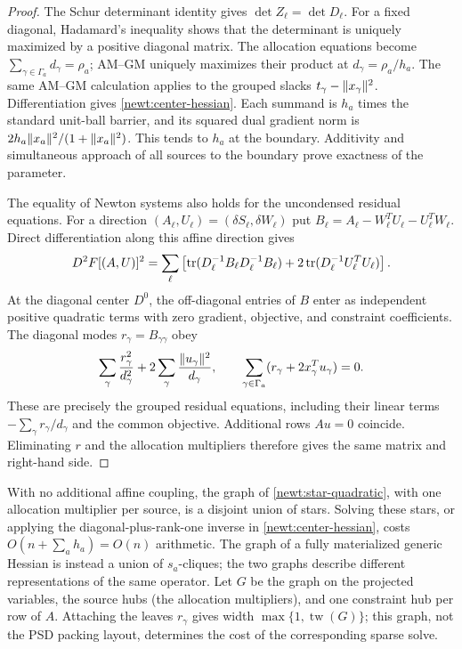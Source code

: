 \begin{proof}
The Schur determinant identity gives $\det Z_\ell=\det D_\ell$.
For a fixed diagonal, Hadamard's inequality shows that the determinant
is uniquely maximized by a positive diagonal matrix.  The allocation equations become
$\sum_{\gamma\in\Gamma_a}d_\gamma=\rho_a$; AM--GM uniquely maximizes
their product at $d_\gamma=\rho_a/h_a$.  The same AM--GM calculation
applies to the grouped slacks $t_\gamma-\lVert x_\gamma\rVert^2$.
Differentiation gives \eqref{newt:center-hessian}.  Each summand is $h_a$
times the standard unit-ball barrier, and its squared dual gradient norm is
$2h_a\lVert x_a\rVert^2/(1+\lVert x_a\rVert^2)$.  This tends to $h_a$ at the
boundary.  Additivity and simultaneous approach of all sources to the
boundary prove exactness of the parameter.

The equality of Newton systems also holds for the uncondensed residual
equations.  For a direction $(A_\ell,U_\ell)=(\delta S_\ell,\delta W_\ell)$
put $B_\ell=A_\ell-W_\ell^TU_\ell-U_\ell^TW_\ell$.  Direct
differentiation along this affine direction gives
\begin{equation}\label{newt:lifted-hessian}
 D^2F[(A,U)]^2=\sum_\ell\left[
 \operatorname{tr}(D_\ell^{-1}B_\ell D_\ell^{-1}B_\ell)
       +2\operatorname{tr}(D_\ell^{-1}U_\ell^TU_\ell)\right].
\end{equation}
At the diagonal center $D^0$, the off-diagonal entries of $B$ enter as
independent positive quadratic terms with zero gradient, objective, and
constraint coefficients.  The diagonal modes $r_\gamma=B_{\gamma\gamma}$ obey
\begin{equation}\label{newt:star-quadratic}
 \sum_\gamma\frac{r_\gamma^2}{d_\gamma^2}
       +2\sum_\gamma\frac{\lVert u_\gamma\rVert^2}{d_\gamma},
 \qquad
 \sum_{\gamma\in\Gamma_a}
       (r_\gamma+2x_\gamma^Tu_\gamma)=0.
\end{equation}
These are precisely the grouped residual equations, including their
linear terms $-\sum_\gamma r_\gamma/d_\gamma$ and the common objective.
Additional rows $Au=0$ coincide.  Eliminating $r$ and the allocation
multipliers therefore gives the same matrix and right-hand side.
\end{proof}

With no additional affine coupling, the graph of
\eqref{newt:star-quadratic}, with one allocation multiplier per source,
is a disjoint union of stars.  Solving these stars, or applying the
diagonal-plus-rank-one inverse in \eqref{newt:center-hessian}, costs
$O(n+\sum_a h_a)=O(n)$ arithmetic.  The graph of a fully materialized
generic Hessian is instead a union of $s_a$-cliques; the two graphs
describe different representations of the same operator.
Let $G$ be the graph on the projected variables, the source hubs (the
allocation multipliers), and one constraint hub per row of $A$.
Attaching the leaves $r_\gamma$ gives width
$\max\{1,\operatorname{tw}(G)\}$; this graph, not the PSD packing
layout, determines the cost of the corresponding sparse solve.

